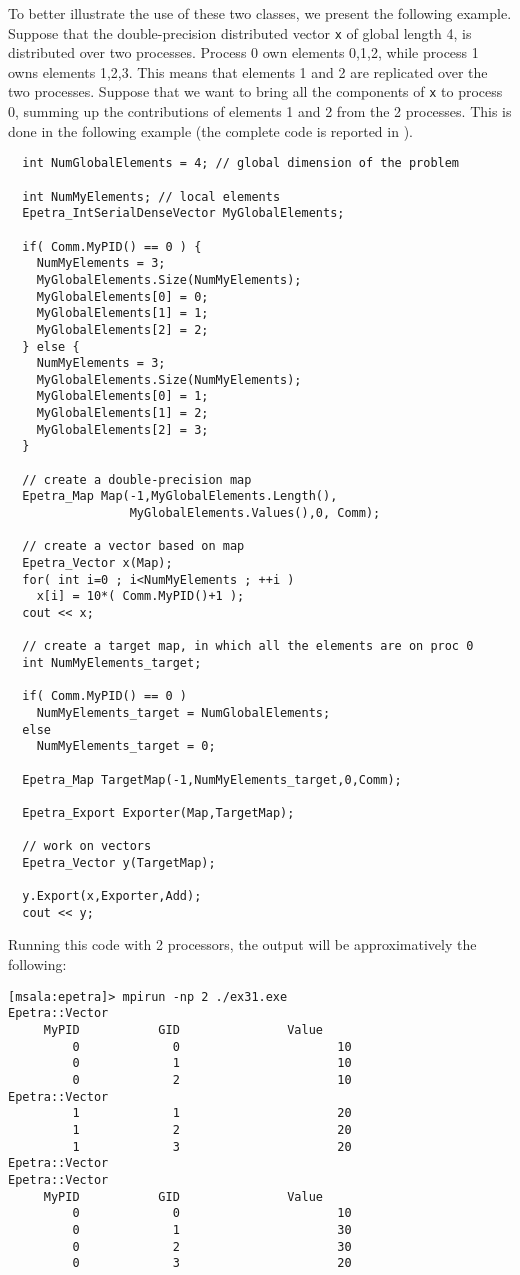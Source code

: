 To better illustrate the use of these two classes, we present the
following example. Suppose that the double-precision distributed vector
\verb!x! of global length 4, is distributed over two processes. Process
0 own elements 0,1,2, while process 1 owns elements 1,2,3. This means
that elements 1 and 2 are replicated over the two processes. Suppose
that we want to bring all the components of \verb!x!  to process 0,
summing up the contributions of elements 1 and 2 from the 2 processes.
This is done in the following example (the complete code is reported in
).
\begin{verbatim}
  int NumGlobalElements = 4; // global dimension of the problem

  int NumMyElements; // local elements
  Epetra_IntSerialDenseVector MyGlobalElements;

  if( Comm.MyPID() == 0 ) {
    NumMyElements = 3;
    MyGlobalElements.Size(NumMyElements);
    MyGlobalElements[0] = 0;
    MyGlobalElements[1] = 1;
    MyGlobalElements[2] = 2;
  } else {
    NumMyElements = 3;
    MyGlobalElements.Size(NumMyElements);
    MyGlobalElements[0] = 1;
    MyGlobalElements[1] = 2;
    MyGlobalElements[2] = 3;
  }

  // create a double-precision map
  Epetra_Map Map(-1,MyGlobalElements.Length(),
                 MyGlobalElements.Values(),0, Comm);

  // create a vector based on map
  Epetra_Vector x(Map);
  for( int i=0 ; i<NumMyElements ; ++i )
    x[i] = 10*( Comm.MyPID()+1 );
  cout << x;

  // create a target map, in which all the elements are on proc 0
  int NumMyElements_target;

  if( Comm.MyPID() == 0 )
    NumMyElements_target = NumGlobalElements;
  else
    NumMyElements_target = 0;

  Epetra_Map TargetMap(-1,NumMyElements_target,0,Comm);

  Epetra_Export Exporter(Map,TargetMap);

  // work on vectors
  Epetra_Vector y(TargetMap);

  y.Export(x,Exporter,Add);
  cout << y;
\end{verbatim}

Running this code with 2 processors, the output will be approximatively
the following:
\begin{verbatim}
[msala:epetra]> mpirun -np 2 ./ex31.exe
Epetra::Vector
     MyPID           GID               Value
         0             0                      10
         0             1                      10
         0             2                      10
Epetra::Vector
         1             1                      20
         1             2                      20
         1             3                      20
Epetra::Vector
Epetra::Vector
     MyPID           GID               Value
         0             0                      10
         0             1                      30
         0             2                      30
         0             3                      20
\end{verbatim}


